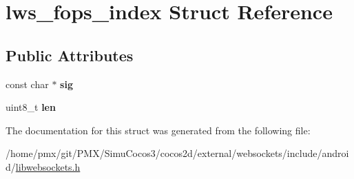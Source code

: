 \hypertarget{structlws__fops__index}{}\section{lws\+\_\+fops\+\_\+index Struct Reference}
\label{structlws__fops__index}
\subsection*{Public Attributes}
\begin{DoxyCompactItemize}
\item 
\mbox{\label{structlws__fops__index_a6badae4aad37e5281a7cc2960f487d3d}} 
const char $\ast$ {\bfseries sig}
\item 
\mbox{\label{structlws__fops__index_ad30d4f3ab5a0158de5902aa774941046}} 
uint8\+\_\+t {\bfseries len}
\end{DoxyCompactItemize}


The documentation for this struct was generated from the following file\+:\begin{DoxyCompactItemize}
\item 
/home/pmx/git/\+P\+M\+X/\+Simu\+Cocos3/cocos2d/external/websockets/include/android/\hyperlink{_2cocos2d_2external_2websockets_2include_2android_2libwebsockets_8h}{libwebsockets.\+h}\end{DoxyCompactItemize}
